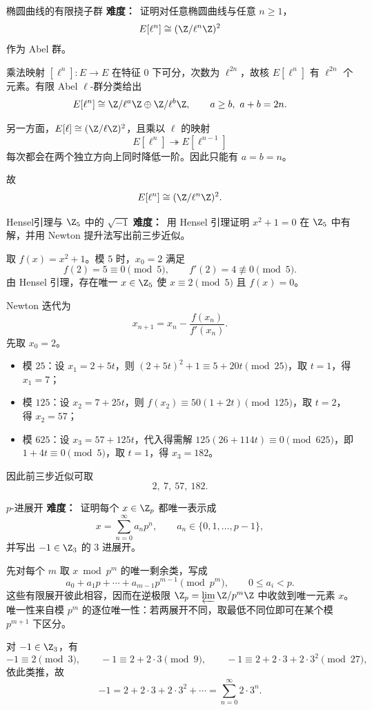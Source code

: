 \begin{problem}{椭圆曲线的有限挠子群}
\textbf{难度：}\medium\ 证明对任意椭圆曲线与任意 $n\ge1$，
\[
E[\ell^n]\cong (\Z/\ell^n\Z)^2
\]
作为 Abel 群。
\end{problem}
\begin{solution}
乘法映射 $[\ell^n]:E\to E$ 在特征 $0$ 下可分，次数为 $\ell^{2n}$，故核 $E[\ell^n]$ 有 $\ell^{2n}$ 个元素。有限 Abel $\ell$-群分类给出
\[
E[\ell^n]\cong \Z/\ell^a\Z\oplus\Z/\ell^b\Z,
\qquad a\ge b,
\ a+b=2n.
\]

另一方面，$E[\ell]\cong (\Z/\ell\Z)^2$，且乘以 $\ell$ 的映射
\[
E[\ell^n]\twoheadrightarrow E[\ell^{n-1}]
\]
每次都会在两个独立方向上同时降低一阶。因此只能有 $a=b=n$。

故
\[
E[\ell^n]\cong (\Z/\ell^n\Z)^2.
\]
\end{solution}

\begin{problem}{Hensel引理与 $\Z_5$ 中的 $\sqrt{-1}$}
\textbf{难度：}\medium\ 用 Hensel 引理证明 $x^2+1=0$ 在 $\Z_5$ 中有解，并用 Newton 提升法写出前三步近似。
\end{problem}
\begin{solution}
取 $f(x)=x^2+1$。模 $5$ 时，$x_0=2$ 满足
\[
f(2)=5\equiv0\pmod5,
\qquad f'(2)=4\not\equiv0\pmod5.
\]
由 Hensel 引理，存在唯一 $x\in\Z_5$ 使 $x\equiv2\pmod5$ 且 $f(x)=0$。

Newton 迭代为
\[
x_{n+1}=x_n-\frac{f(x_n)}{f'(x_n)}.
\]
先取 $x_0=2$。
\begin{itemize}
  \item 模 $25$：设 $x_1=2+5t$，则 $(2+5t)^2+1\equiv5+20t\pmod{25}$，取 $t=1$，得 $x_1=7$；
  \item 模 $125$：设 $x_2=7+25t$，则 $f(x_2)\equiv50(1+2t)\pmod{125}$，取 $t=2$，得 $x_2=57$；
  \item 模 $625$：设 $x_3=57+125t$，代入得需解 $125(26+114t)\equiv0\pmod{625}$，即 $1+4t\equiv0\pmod5$，取 $t=1$，得 $x_3=182$。
\end{itemize}
因此前三步近似可取
\[
2,\ 7,\ 57,\ 182.
\]
\end{solution}

\begin{problem}{$p$-进展开}
\textbf{难度：}\medium\ 证明每个 $x\in\Z_p$ 都唯一表示成
\[
x=\sum_{n=0}^\infty a_np^n,
\qquad a_n\in\{0,1,\dots,p-1\},
\]
并写出 $-1\in\Z_3$ 的 3 进展开。
\end{problem}
\begin{solution}
先对每个 $m$ 取 $x\bmod p^m$ 的唯一剩余类，写成
\[
a_0+a_1p+\cdots+a_{m-1}p^{m-1}\pmod{p^m},
\qquad 0\le a_i<p.
\]
这些有限展开彼此相容，因而在逆极限 $\Z_p=\varprojlim \Z/p^m\Z$ 中收敛到唯一元素 $x$。唯一性来自模 $p^m$ 的逐位唯一性：若两展开不同，取最低不同位即可在某个模 $p^{m+1}$ 下区分。

对 $-1\in\Z_3$，有
\[
-1\equiv2\pmod3,
\qquad -1\equiv2+2\cdot3\pmod9,
\qquad -1\equiv2+2\cdot3+2\cdot3^2\pmod{27},
\]
依此类推，故
\[
-1=2+2\cdot3+2\cdot3^2+\cdots=\sum_{n=0}^\infty 2\cdot3^n.
\]
\end{solution}

